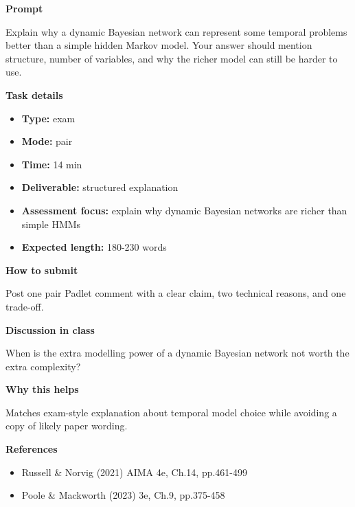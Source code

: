 \documentclass[11pt]{article}
\begin{document}
\begin{tcolorbox}[colback=white,colframe=MidnightBlue,title={Q5 Exam-Style Constructed Response},fonttitle=\bfseries,breakable]
\begin{center}
\end{center}

{\large\bfseries\color{MidnightBlue} Prompt}\par\medskip
Explain why a dynamic Bayesian network can represent some temporal problems better than a simple hidden Markov model. Your answer should mention structure, number of variables, and why the richer model can still be harder to use.

{\large\bfseries\color{MidnightBlue} Task details}\par\medskip
\begin{itemize}\item \textbf{Type:} exam
\item \textbf{Mode:} pair
\item \textbf{Time:} 14 min
\item \textbf{Deliverable:} structured explanation
\item \textbf{Assessment focus:} explain why dynamic Bayesian networks are richer than simple HMMs
\item \textbf{Expected length:} 180-230 words\end{itemize}

{\large\bfseries\color{MidnightBlue} How to submit}\par\medskip
Post one pair Padlet comment with a clear claim, two technical reasons, and one trade-off.

{\large\bfseries\color{MidnightBlue} Discussion in class}\par\medskip
When is the extra modelling power of a dynamic Bayesian network not worth the extra complexity?

{\large\bfseries\color{MidnightBlue} Why this helps}\par\medskip
Matches exam-style explanation about temporal model choice while avoiding a copy of likely paper wording.

{\large\bfseries\color{MidnightBlue} References}\par\medskip
\begin{itemize}\item Russell \& Norvig (2021) AIMA 4e, Ch.14, pp.461-499
\item Poole \& Mackworth (2023) 3e, Ch.9, pp.375-458\end{itemize}
\end{tcolorbox}
\end{document}
